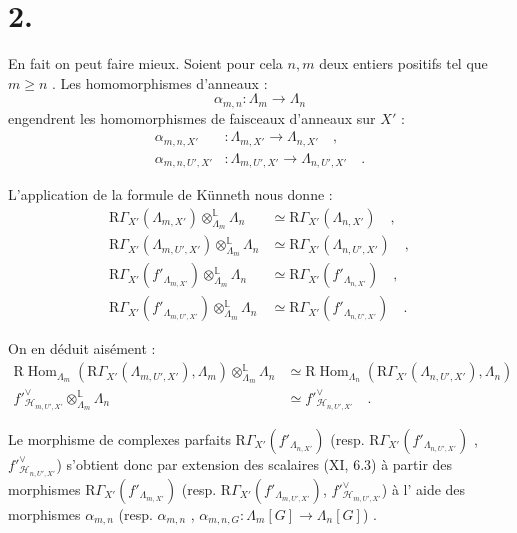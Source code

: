 \documentclass[11pt]{article}
\DeclareMathOperator{\Hom}{Hom}
\newcommand{\R}{\mathrm{R}}\newcommand{\RHomCore}{\mathrm{RHom}}
\providecommand{\Hom}{\operatorname{Hom}}
\providecommand{\R}{\mathrm R}
\providecommand{\La}{\Lambda}
\providecommand{\Hom}{\operatorname{Hom}}
\begin{document}
\section*{2.}
En fait on peut faire mieux. Soient pour cela $n,m$ deux entiers positifs tel que $m \geq n$ . Les homomorphismes d'anneaux :
\[
\alpha_{m,n} : \La_m \longrightarrow \La_n
\]
engendrent les homomorphismes de faisceaux d'anneaux sur $X'$ :
\begin{align*}
\alpha_{m,n,X'} &: \La_{m,X'} \longrightarrow \La_{n,X'} \quad , \\
\alpha_{m,n,U',X'} &: \La_{m,U',X'} \longrightarrow \La_{n,U',X'} \quad .
\end{align*}

L'application de la formule de Künneth nous donne :
\begin{align}
\tag{2.1} \R\Gamma_{X'}(\La_{m,X'}) \otimes_{\La_m}^{\mathbb{L}} \La_n &\simeq \R\Gamma_{X'}(\La_{n,X'}) \quad , \\
\tag{2.2} \R\Gamma_{X'}(\La_{m,U',X'}) \otimes_{\La_m}^{\mathbb{L}} \La_n &\simeq \R\Gamma_{X'}(\La_{n,U',X'}) \quad , \\
\tag{2.3} \R\Gamma_{X'}(f'_{\La_{m,X'}}) \otimes_{\La_m}^{\mathbb{L}} \La_n &\simeq \R\Gamma_{X'}(f'_{\La_{n,X'}}) \quad , \\
\tag{2.4} \R\Gamma_{X'}(f'_{\La_{m,U',X'}}) \otimes_{\La_m}^{\mathbb{L}} \La_n &\simeq \R\Gamma_{X'}(f'_{\La_{n,U',X'}}) \quad .
\end{align}

On en déduit aisément :
\begin{align}
\tag{2.5} \R\Hom_{\La_m}(\R\Gamma_{X'}(\La_{m,U',X'}), \La_m) \otimes_{\La_m}^{\mathbb{L}} \La_n &\simeq \R\Hom_{\La_n}(\R\Gamma_{X'}(\La_{n,U',X'}), \La_n) \\
\tag{2.6} f'^\vee_{\mathcal{H}_{m,U',X'}} \otimes_{\La_m}^{\mathbb{L}} \La_n &\simeq f'^\vee_{\mathcal{H}_{n,U',X'}} \quad .
\end{align}

Le morphisme de complexes parfaits $\R\Gamma_{X'}(f'_{\La_{n,X'}})$ (resp. $\R\Gamma_{X'}(f'_{\La_{n,U',X'}})$ , $f'^\vee_{\mathcal{H}_{n,U',X'}}$) s'obtient donc par extension des scalaires (XI, 6.3) à partir des morphismes $\R\Gamma_{X'}(f'_{\La_{m,X'}})$ (resp. $\R\Gamma_{X'}(f'_{\La_{m,U',X'}})$, $f'^\vee_{\mathcal{H}_{m,U',X'}}$) 
à l'%
aide des morphismes $\alpha_{m,n}$ (resp. $\alpha_{m,n}$ , $\alpha_{m,n,G} : \La_m[G] \longrightarrow \La_n[G]$) .
\end{document}
